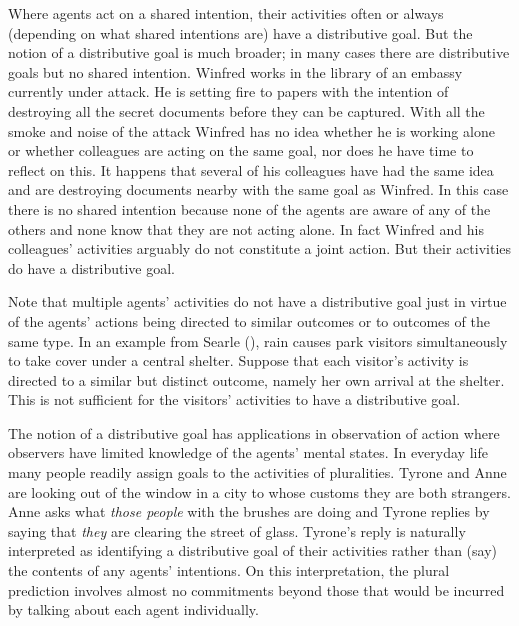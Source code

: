 \documentclass[12pt,a4paper]{extarticle}
\begin{document}
Where agents act on a shared intention, their activities often or always (depending on what shared intentions are) have a distributive goal.  
But the notion of a distributive goal is much broader; in many cases there are distributive goals but no shared intention.
Winfred works in the library of an embassy currently under attack.  
He is setting fire to papers with the intention of destroying all the secret documents before they can be captured.
With all the smoke and  noise of the attack Winfred has no idea whether he is working alone or whether colleagues are acting on the same goal, nor does he have time to reflect on this.
It happens that several of his colleagues have had the same idea and are destroying documents nearby with the same goal as Winfred.
In this case there is no shared intention because none of the agents are aware of any of the others and none know that they are not acting alone.
In fact Winfred and his colleagues' activities arguably do not constitute a joint action.
But their activities do have a distributive goal.


Note that multiple agents' activities do not have a distributive goal just in virtue of the agents' actions being directed to similar outcomes or to outcomes of the same type.  In an example from Searle (\citeyear[p.\ 92]{Searle:1990em}), rain causes park visitors simultaneously to take cover under a central shelter.  Suppose that each visitor's activity is directed to a similar but distinct outcome, namely her own arrival at the shelter.  This is not sufficient for the visitors' activities to have a distributive goal.

The notion of a distributive goal has applications in observation of action where observers have limited knowledge  of the agents' mental states.
In everyday life many people readily assign goals to the activities of pluralities.  
Tyrone and Anne are looking out of the window in a city to whose customs they are both strangers.  Anne asks what \emph{those people} with the brushes are doing and Tyrone replies by saying that \emph{they} are clearing the street of glass.
Tyrone's reply is naturally interpreted as identifying a distributive goal of their activities rather than (say) the contents of any agents' intentions.
On this interpretation, the plural prediction involves almost no commitments beyond those that would be incurred by talking about each agent individually.
\end{document}
